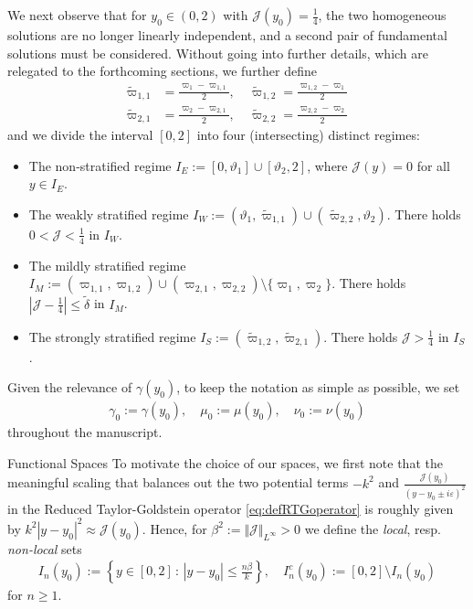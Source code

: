 \documentclass[11pt,reqno]{amsproc}
\makeatletter
\renewcommand\subsection{\@startsection{subsection}{2}%
\normalparindent{.5\linespacing\@plus.7\linespacing}{-.5em}
{\normalfont\bfseries}}
\theoremstyle{definition}
\numberwithin{equation}{section}
\newcommand{\cJ}{{\mathcal{J}}}
\newcommand{\ep}{\varepsilon}
\makeatother
\begin{document}
We next observe that for $y_0\in (0,2)$ with $\cJ(y_0)=\frac14$, the two homogeneous solutions are no longer linearly independent, and a second pair of fundamental solutions must be considered.  Without going into further details, which are relegated to the forthcoming sections, we further define
\begin{align*}
\widetilde\varpi_{1,1} &= \frac{\varpi_{1}-\varpi_{1,1}}{2}, \quad  \widetilde\varpi_{1,2} = \frac{\varpi_{1,2}-\varpi_{1}}{2} \\
\widetilde\varpi_{2,1} &= \frac{\varpi_{2}-\varpi_{2,1}}{2}, \quad  \widetilde\varpi_{2,2} = \frac{\varpi_{2,2}-\varpi_{2}}{2}
\end{align*}
and we divide the interval $[0,2]$ into four (intersecting) distinct regimes:
\begin{itemize}
\item The non-stratified regime $I_E := [0,\vartheta_1] \cup [\vartheta_2,2]$, where $\cJ(y)=0$ for all $y\in I_E$.
\item The weakly stratified regime $I_W := (\vartheta_1, \widetilde{\varpi}_{1,1}) \cup (\widetilde\varpi_{2,2}, \vartheta_2)$. There holds $0<\cJ< \frac14$ in $I_W$.
\item The mildly stratified regime $I_M :=  ({\varpi}_{1,1}, \varpi_{1,2}) \cup ({\varpi}_{2,1}, \varpi_{2,2})\setminus \lbrace \varpi_1, \varpi_2 \rbrace$. There holds $\left| \cJ -\frac14 \right| \leq \tilde\delta$ in $I_M$.
\item The strongly stratified regime $I_S := (\widetilde\varpi_{1,2}, \widetilde\varpi_{2,1})$. There holds $\cJ > \frac14$ in $I_S$.
\end{itemize}
Given the relevance of $\gamma(y_0)$, to keep the notation as simple as possible, we set
\begin{align*}
\gamma_0 := \gamma(y_0), \quad \mu_0 :=\mu(y_0), \quad \nu_0 := \nu(y_0)
\end{align*}
throughout the manuscript.

\subsection{Functional Spaces}
To motivate the choice of our spaces, we first note that the meaningful scaling that balances out the two potential terms $-k^2$ and $\frac{\cJ(y_0)}{(y-y_0\pm i\ep)^2}$ in the Reduced Taylor-Goldstein operator \eqref{eq:defRTGoperator} is roughly given by $k^2|y-y_0|^2\approx \cJ(y_0)$. Hence, for $\beta^2 := \Vert \cJ \Vert_{L^\infty}>0$ we define the \textit{local}, resp. \textit{non-local} sets
\begin{align*}
I_n(y_0) := \left\lbrace y\in [0,2] \, : \, |y-y_0|\leq \frac{n\beta}{k} \right\rbrace, \quad I_n^c(y_0) := [0,2]\setminus I_n(y_0)
\end{align*}
for $n\geq 1$. 
\end{document}
